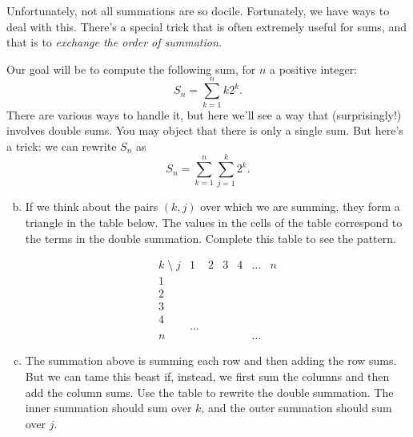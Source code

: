 \documentclass[12pt]{article}
\begin{document}
Unfortunately, not all summations are so docile. Fortunately, we have
ways to deal with this. There's a special trick that is often
extremely useful for sums, and that is to \emph{exchange the order of
  summation.}  


        Our goal will be to compute the following sum, for $n$ a positive integer:
        \[ S_n = \sum_{k=1}^n k2^k. \]
    There are various ways to handle it, but here we'll see a way that (surprisingly!) involves double sums. You may object that there is only a single sum. But here's a trick: we can rewrite $S_n$ as
    \[ S_n = \sum_{k=1}^n \sum_{j=1}^k 2^k. \]

    \begin{enumerate}[(a)]
        \setcounter{enumi}{1}

    \item 
    If we think about the
  pairs $(k,j)$ over which we are summing, they form a triangle in the
  table below. The values in the cells of the table correspond to the
  terms in the double summation. Complete this table to see the pattern.

\[
\begin{array}{c|cccccc}
    k\; {\setminus} \;j &1&2&3&4&\dots&n\\
\hline
1& \\
2 &\\
3 \\
4 \\
 &\dots\\
n &&&&&\dots
\end{array}
\]


\item The summation above is summing each row and then adding the row
  sums.  But we can tame this beast if, instead, we first sum the
  columns and then add the column sums. Use the table to rewrite the
  double summation. The inner summation should sum over $k$, and the
  outer summation should sum over $j$.


\end{enumerate}
\end{document}

